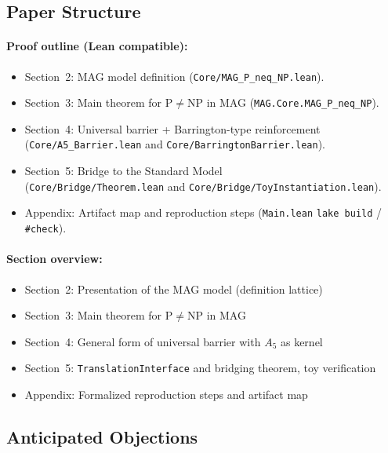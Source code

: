 \documentclass[11pt,a4paper]{article}
\theoremstyle{plain}
\theoremstyle{definition}
\newcommand{\Aalt}{A_5}
\newcommand{\TranslationInterface}{\texttt{TranslationInterface}}
\newcommand{\lean}[1]{\texttt{#1}}
\begin{document}
\subsection{Paper Structure}

\paragraph{Proof outline (Lean compatible):}
\begin{itemize}[nosep]
\item Section~2: MAG model definition (\lean{Core/MAG\_P\_neq\_NP.lean}).
\item Section~3: Main theorem for $\mathrm{P} \neq \mathrm{NP}$ in MAG (\lean{MAG.Core.MAG\_P\_neq\_NP}).
\item Section~4: Universal barrier + Barrington-type reinforcement (\lean{Core/A5\_Barrier.lean} and \lean{Core/BarringtonBarrier.lean}).
\item Section~5: Bridge to the Standard Model\\
 (\lean{Core/Bridge/Theorem.lean} and \lean{Core/Bridge/ToyInstantiation.lean}).
\item Appendix: Artifact map and reproduction steps (\lean{Main.lean} \texttt{lake build} / \texttt{\#check}).
\end{itemize}

\paragraph{Section overview:}
\begin{itemize}[nosep]
\item Section~2: Presentation of the MAG model (definition lattice)
\item Section~3: Main theorem for $\mathrm{P} \neq \mathrm{NP}$ in MAG
\item Section~4: General form of universal barrier with $\Aalt$ as kernel
\item Section~5: \TranslationInterface{} and bridging theorem, toy verification
\item Appendix: Formalized reproduction steps and artifact map
\end{itemize}

\subsection{Anticipated Objections}
\end{document}
